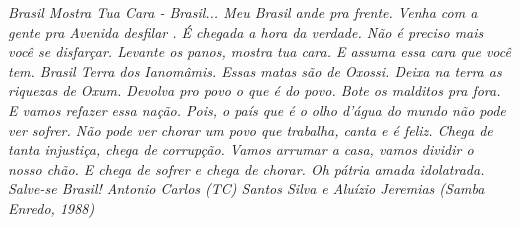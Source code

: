 \begin{epigrafe}
    \vspace*{\fill}
	\begin{flushright}\textit{Brasil Mostra Tua Cara - Brasil... Meu Brasil ande pra frente. Venha com a gente pra Avenida desfilar . \'E chegada a hora da verdade. N\~ao \'e preciso mais voc\^e se disfar\c{c}ar. Levante os panos, mostra tua cara. E assuma essa cara que voc\^e tem. Brasil Terra dos Ianom\^amis. Essas matas s\~ao de Oxossi. Deixa na terra as riquezas de Oxum. Devolva pro povo o que \'e do povo. Bote os malditos pra fora. E vamos refazer essa na\c{c}\~ao. Pois, o pa\'{i}s que  \'e o olho d’\'agua do mundo n\~ao pode ver sofrer. N\~ao pode ver chorar um povo que trabalha, canta e \'e feliz. Chega de tanta injusti\c{c}a, chega de corrup\c{c}\~ao. Vamos arrumar a casa, vamos dividir o nosso ch\~ao. E chega de sofrer e chega de chorar. Oh p\'atria amada idolatrada. Salve-se Brasil! Antonio Carlos (TC) Santos Silva e Alu\'{i}zio Jeremias (Samba Enredo, 1988)}
	\end{flushright}
\end{epigrafe}
